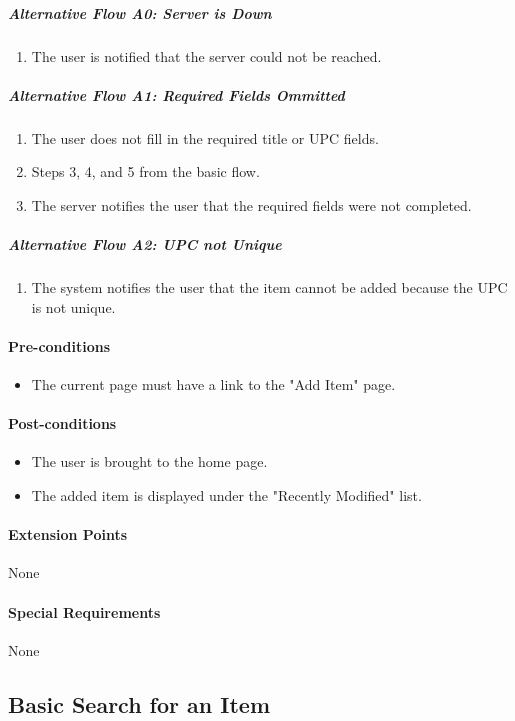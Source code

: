 \documentclass{article}
\begin{document}
\subparagraph{Alternative Flow A0: Server is Down}
\begin{enumerate}
\item The user is notified that the server could not be reached.
\end{enumerate}
\subparagraph{Alternative Flow A1: Required Fields Ommitted}
\begin{enumerate}
\item The user does not fill in the required title or UPC fields.
\item Steps 3, 4, and 5 from the basic flow.
\item The server notifies the user that the required fields were not completed.
\end{enumerate}
\subparagraph{Alternative Flow A2: UPC not Unique}
\begin{enumerate}
\item The system notifies the user that the item cannot be added because the UPC is not unique.
\end{enumerate}

\paragraph{Pre-conditions}
\begin{itemize}
\item The current page must have a link to the "Add Item" page.
\end{itemize}

\paragraph{Post-conditions}
\begin{itemize}
\item The user is brought to the home page.
\item The added item is displayed under the "Recently Modified" list.
\end{itemize}

\paragraph{Extension Points}
None

\paragraph{Special Requirements}
None

\subsection{Basic Search for an Item}
\end{document}
